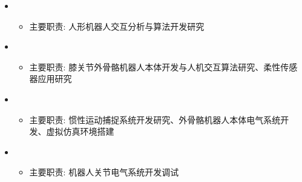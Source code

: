   \begin{itemize}[leftmargin=*]
    \item
      {\small
      \begin{itemize}
        \item{主要职责: 人形机器人交互分析与算法开发研究}
      \end{itemize}}
    \item
      {\small
      \begin{itemize}
        \item{主要职责: 膝关节外骨骼机器人本体开发与人机交互算法研究、柔性传感器应用研究}
      \end{itemize}}
    \item
      {\small
      \begin{itemize}
        \item{主要职责: 惯性运动捕捉系统开发研究、外骨骼机器人本体电气系统开发、虚拟仿真环境搭建}
      \end{itemize}}
    \item
      {\small
      \begin{itemize}
        \item{主要职责: 机器人关节电气系统开发调试}
      \end{itemize}}
  \end{itemize}